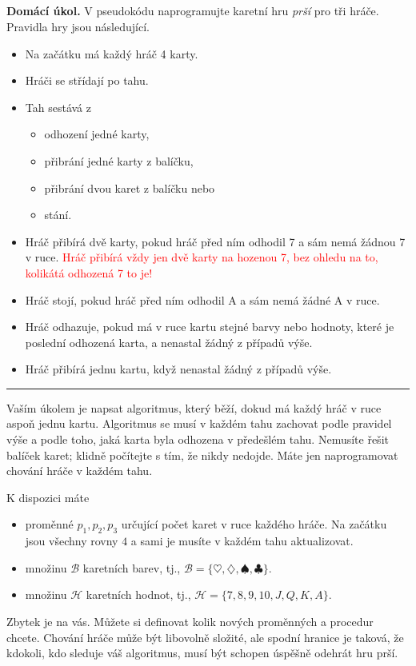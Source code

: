 \documentclass[a4paper,11pt]{article}
\title{\Huge\textsf{}\\
 \Large\textsf{}
 \author{}
 \date{}
}
\begin{document}
\thispagestyle{fancy}

\textbf{Domácí úkol.} V pseudokódu naprogramujte karetní hru \emph{prší} pro tři
hráče. Pravidla hry jsou následující.
\begin{itemize}
 \item Na začátku má každý hráč 4 karty.
 \item Hráči se střídají po tahu.
 \item Tah sestává z
  \begin{itemize}
   \item odhození jedné karty,
   \item přibrání jedné karty z balíčku,
   \item přibrání dvou karet z balíčku nebo
   \item stání.
  \end{itemize}
 \item Hráč přibírá dvě karty, pokud hráč před ním odhodil 7 a sám nemá žádnou 7
  v ruce. \textcolor{red}{Hráč přibírá vždy jen dvě karty na hozenou 7, bez
  ohledu na to, kolikátá odhozená 7 to je!}
 \item Hráč stojí, pokud hráč před ním odhodil A a sám nemá žádné A v ruce.
 \item Hráč odhazuje, pokud má v ruce kartu stejné barvy nebo hodnoty, které je
  poslední odhozená karta, a nenastal žádný z případů výše.
 \item Hráč přibírá jednu kartu, když nenastal žádný z případů výše.
\end{itemize}

\vspace{\parskip}
\hrule

Vaším úkolem je napsat algoritmus, který běží, dokud má každý hráč v ruce aspoň
jednu kartu. Algoritmus se musí v každém tahu zachovat podle pravidel výše a
podle toho, jaká karta byla odhozena v předešlém tahu. Nemusíte řešit balíček
karet; klidně počítejte s tím, že nikdy nedojde. Máte jen naprogramovat chování
hráče v každém tahu.

K dispozici máte
\begin{itemize}
 \item proměnné $p_1,p_2,p_3$ určující počet karet v ruce každého hráče. Na
  začátku jsou všechny rovny $4$ a sami je musíte v každém tahu aktualizovat.
 \item množinu $\mathcal{B}$ karetních barev, tj., $\mathcal{B} = \{\heartsuit,
  \diamondsuit, \spadesuit, \clubsuit\}$.
 \item množinu $\mathcal{H}$ karetních hodnot, tj., $\mathcal{H} = \{7, 8, 9,
  10, J, Q, K, A\}$.
\end{itemize}
Zbytek je na vás. Můžete si definovat kolik nových proměnných a procedur chcete.
Chování hráče může být libovolně složité, ale spodní hranice je taková, že
kdokoli, kdo sleduje váš algoritmus, musí být schopen úspěšně odehrát hru prší.
\end{document}
